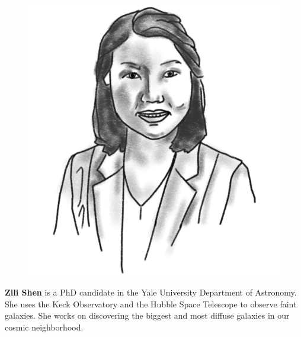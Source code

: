 \begin{figure}
\vspace{-1.75\intextsep}
\includegraphics[width=0.9\linewidth]{portraits/zili.png}
\end{figure}
\textbf{Zili Shen} is a PhD candidate in the Yale University Department of Astronomy. She uses the Keck Observatory and the Hubble Space Telescope to observe faint galaxies. She works on discovering the biggest and most diffuse galaxies in our cosmic neighborhood.\\
\\

